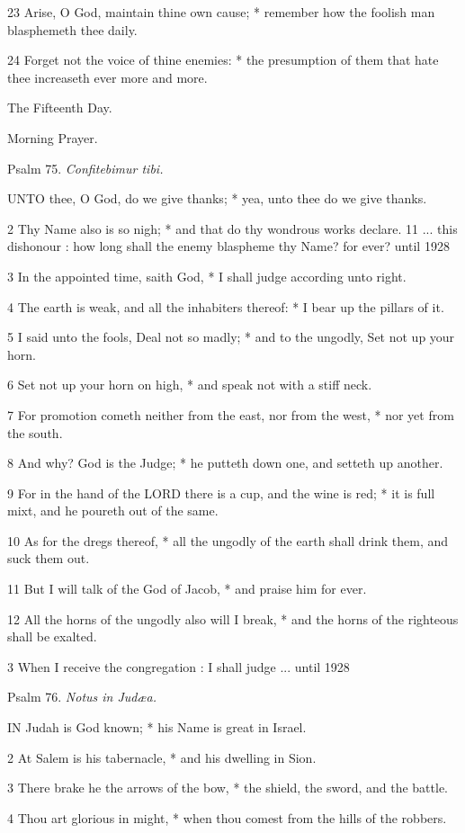23 Arise, O God, maintain thine own cause; * remember
how the foolish man blasphemeth thee daily.

24 Forget not the voice of thine enemies: * the presumption
of them that hate thee increaseth ever more and more. 

The
Fifteenth Day.

Morning
Prayer.

Psalm
75. \emph{Confitebimur tibi.}

UNTO
thee, O God, do we give thanks; * yea, unto thee do we give thanks.

2 Thy Name also is so nigh; * and that do thy wondrous
works declare. 11 ... this dishonour : how
long shall the enemy blaspheme thy Name? for ever?
until 1928

3 In the appointed time, saith God, * I shall judge according unto right.

4 The earth is weak, and all the inhabiters thereof:
* I bear up the pillars of it.

5 I said unto the fools, Deal not so madly; * and to
the ungodly, Set not up your horn.

6 Set not up your horn on high, * and speak not with
a stiff neck.

7 For promotion cometh neither from the east, nor from
the west, * nor yet from the south.

8 And why? God is the Judge; * he putteth down one, and
setteth up another.

9 For in the hand of the LORD there is a cup, and the
wine is red; * it is full mixt, and he poureth out of the same.

10 As for the dregs thereof, * all the ungodly of the
earth shall drink them, and suck them out.

11 But I will talk of the God of Jacob, * and praise
him for ever.

12 All the horns of the ungodly also will I break, *
and the horns of the righteous shall be exalted.

3 When I receive the congregation
: I shall judge ...
until 1928

Psalm
76. \emph{Notus in Judæa.}

IN
Judah is God known; * his Name is great in Israel.

2 At Salem is his tabernacle, * and his dwelling in
Sion.

3 There brake he the arrows of the bow, * the shield,
the sword, and the battle.

4 Thou art glorious in might, * when thou comest from the hills of the
robbers.

